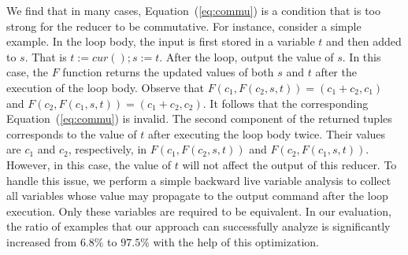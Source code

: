 \documentclass{llncs}
\newcommand{\cur}{cur()}
\begin{document}
We find that in many cases, Equation~(\ref{eq:commu}) is a condition that is too strong for the reducer to be commutative. For instance, consider a simple example. In the loop body, the input is first stored in a variable $t$ and then added to $s$. 
That is $t:=\cur;s:=t$.
After the loop, output the value of $s$.
In this case, the $F$ function returns the updated values of both $s$ and $t$ after the execution of the loop body. Observe that
$F(c_1, F(c_2,s,t)) = (c_1+c_2, c_1)$ and $F(c_2, F(c_1,s,t)) = (c_1+c_2, c_2)$. It follows that the corresponding Equation~(\ref{eq:commu}) is invalid. The second component of the returned tuples corresponds to the value of $t$ after executing the loop body twice. Their values are $c_1$ and $c_2$, respectively, in $F(c_1, F(c_2,s,t))$ and $F(c_2, F(c_1,s,t))$. However, in this case, the value of $t$ will not affect the output of this reducer.
To handle this issue, we perform a simple backward live variable analysis to collect all variables whose value may propagate to the output command after the loop execution. Only these variables are required to be equivalent. In our evaluation, the ratio of examples that our approach can successfully analyze is significantly increased from $6.8\%$ to $97.5\%$ with the help of this optimization. 
\end{document}
